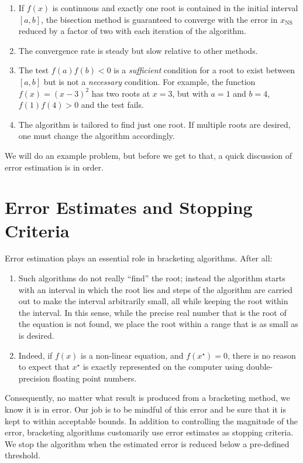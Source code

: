 \begin{enumerate}
\item If $f(x)$ is continuous and exactly one root is contained in the initial interval $[a,b]$, the bisection method is guaranteed to converge with the error in $x_{\text{NS}}$ reduced by a factor of two with each iteration of the algorithm.
\item The convergence rate is steady but slow relative to other methods.
\item The test $f(a)f(b)<0$ is a \emph{sufficient} condition for a root to exist between $[a,b]$ but is not a \emph{necessary} condition.  For example, the function $f(x)=\left(x-3\right)^2$ has two roots at $x=3$, but with $a=1$ and $b=4$, $f(1)f(4)>0$ and the test fails.
\item The algorithm is tailored to find just one root.  If multiple roots are desired, one must change the algorithm accordingly.
\end{enumerate}
We will do an example problem, but before we get to that, a quick discussion of error estimation is in order.

\section{Error Estimates and Stopping Criteria}
Error estimation plays an essential role in bracketing algorithms.  After all:
\begin{enumerate}
\item Such algorithms do not really ``find'' the root; instead the algorithm starts with an interval in which the root lies and steps of the algorithm are carried out to make the interval arbitrarily small, all while keeping the root within the interval.  In this sense, while the precise real number that is the root of the equation is not found, we place the root within a range that is as small as is desired.

\item Indeed, if $f(x)$ is a non-linear equation, and $f(x^{\star})=0$, there is no reason to expect that $x^{\star}$ is exactly represented on the computer using double-precision floating point numbers.
\end{enumerate}
Consequently, no matter what result is produced from a bracketing method, we know it is in error.  Our job is to be mindful of this error and be sure that it is kept to within acceptable bounds.  In addition to controlling the magnitude of the error, bracketing algorithms customarily use error estimates as stopping criteria.  We stop the algorithm when the estimated error is reduced below a pre-defined threshold.

